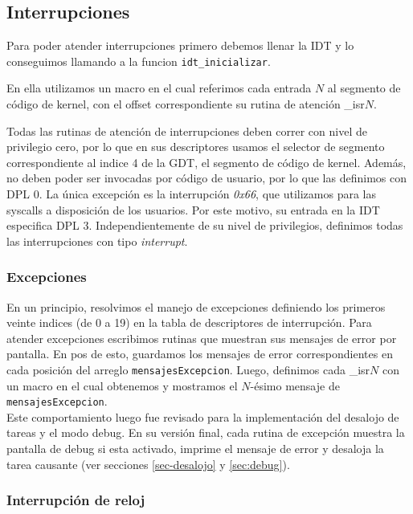 \subsection{Interrupciones}

Para poder atender interrupciones primero debemos llenar la IDT y lo conseguimos llamando a la funcion \verb|idt_inicializar|. 

En ella utilizamos un macro en el cual referimos cada entrada $N$ al segmento de código de kernel, con el offset correspondiente su rutina de atención \_isr$N$. 

Todas las rutinas de atención de interrupciones deben correr con nivel de privilegio cero, por lo que en sus descriptores usamos el selector de segmento correspondiente al indice 4 de la GDT, el segmento de código de kernel.
Además, no deben poder ser invocadas por código de usuario, por lo que las definimos con DPL 0. La única excepción es la interrupción \textit{0x66}, que utilizamos para las syscalls a disposición de los usuarios. Por este motivo, su entrada en la IDT especifica DPL 3.
Independientemente de su nivel de privilegios, definimos todas las interrupciones con tipo \textit{interrupt}.\\



\subsubsection{Excepciones}

En un principio, resolvimos el manejo de excepciones definiendo los primeros veinte indices (de 0 a 19) en la tabla de descriptores de interrupción. 
Para atender excepciones escribimos rutinas que muestran sus mensajes de error por pantalla.
En pos de esto, guardamos los mensajes de error correspondientes en cada posición del arreglo \verb|mensajesExcepcion|.
Luego, definimos cada \_isr$N$ con un macro en el cual obtenemos y mostramos el $N$-ésimo mensaje de \verb|mensajesExcepcion|.\\

Este comportamiento luego fue revisado para la implementación del desalojo de tareas y el modo debug. En su versión final, cada rutina de excepción muestra la pantalla de debug si esta activado, imprime el mensaje de error y desaloja la tarea causante (ver secciones \ref{sec-desalojo} y \ref{sec:debug}).\\

\newpage


\subsubsection{Interrupción de reloj}

